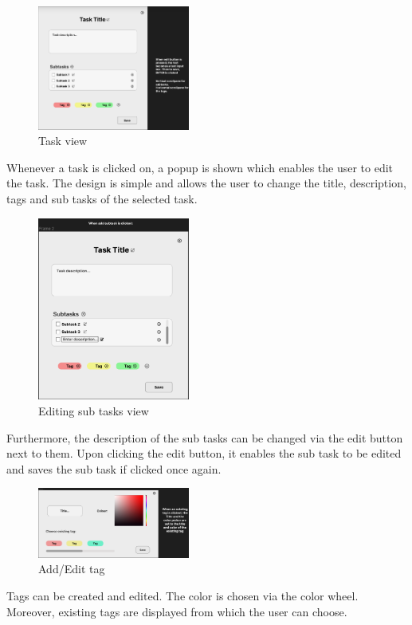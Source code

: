 \begin{figure}[H]
\includegraphics[width=5cm]{content/mockups/task_view_frame_1.png} 
\caption{Task view}
\end{figure}

Whenever a task is clicked on, a popup is shown which enables the user to edit the task. The design is simple and allows the user to change the title, description, tags and sub tasks of the selected task.

\begin{figure}[H]
\includegraphics[width=5cm]{content/mockups/task_view_frame_2.png} 
\caption{Editing sub tasks view}
\end{figure}

Furthermore, the description of the sub tasks can be changed via the edit button next to them. Upon clicking the edit button, it enables the sub task to be edited and saves the sub task if clicked once again.

\begin{figure}[H]
\includegraphics[width=5cm]{content/mockups/edit_tag.png} 
\caption{Add/Edit tag}
\end{figure}

Tags can be created and edited. The color is chosen via the color wheel. Moreover, existing tags are displayed from which the user can choose.